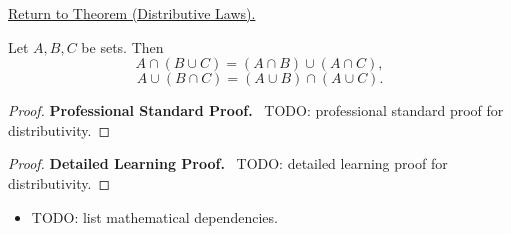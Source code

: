 \newpage
{}
\label{prf:distributivity}

\begin{remark*}[Return]
\hyperref[thm:distributivity]{Return to Theorem (Distributive Laws).}
\end{remark*}

\begin{theorem*}
Let $A,B,C$ be sets. Then
\[
A \cap (B \cup C) = (A \cap B) \cup (A \cap C),
\]
\[
A \cup (B \cap C) = (A \cup B) \cap (A \cup C).
\]
\end{theorem*}

\begin{proof}
\textbf{Professional Standard Proof.}~
TODO: professional standard proof for distributivity.
\end{proof}

\begin{proof}
\textbf{Detailed Learning Proof.}~
TODO: detailed learning proof for distributivity.
\end{proof}

\begin{remark*}
\end{remark*}

\begin{dependencies}
\begin{itemize}
  \item TODO: list mathematical dependencies.
\end{itemize}
\end{dependencies}

\clearpage
